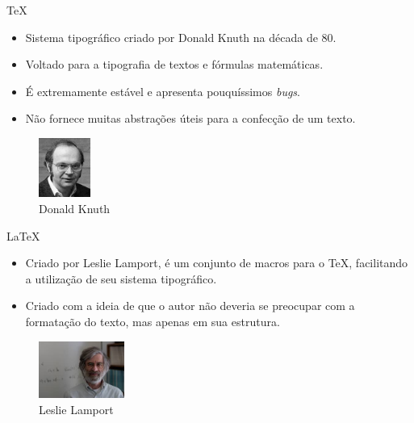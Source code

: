 \begin{frame}{\TeX{}}
    \begin{itemize}
        \item Sistema tipográfico criado por Donald Knuth na década de 80.
        \item Voltado para a tipografia de textos e fórmulas matemáticas.
        \item É extremamente estável e apresenta pouquíssimos \textit{bugs}.
        \item Não fornece muitas abstrações úteis para a confecção de um texto.
    \end{itemize}
\begin{figure}[htbp]
    \centering
    \includegraphics[width=0.15\textwidth]{figuras/donald.jpeg}
    \caption{Donald Knuth}
    \label{fig:tipografia}
\end{figure}
\end{frame}

\begin{frame}{\LaTeX{}}
    \begin{itemize}
        \item Criado por Leslie Lamport, é um conjunto de macros para o \TeX{}, facilitando a utilização de seu sistema tipográfico.
        \item Criado com a ideia de que o autor não deveria se preocupar com a formatação do texto, mas apenas em sua estrutura.
    \end{itemize}
    \begin{figure}[htbp]
    \centering
    \includegraphics[width=0.25\textwidth]{figuras/leslie.jpeg}
    \caption{Leslie Lamport}
    \label{fig:leslie}
\end{figure}
\end{frame}

